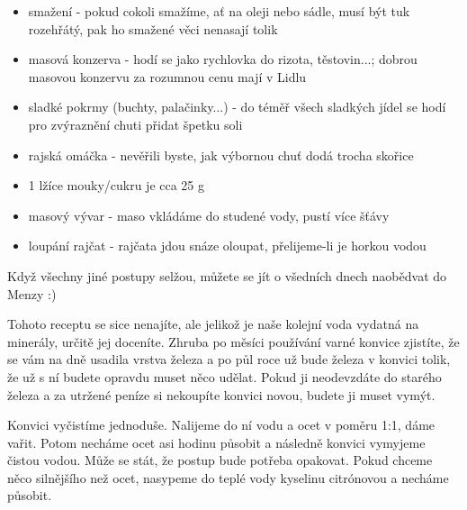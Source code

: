 \begin{itemize}
\item smažení - pokud cokoli smažíme, ať na oleji nebo sádle, musí být tuk
rozehřátý, pak ho smažené věci nenasají tolik
\item masová konzerva - hodí se jako rychlovka do rizota, těstovin...; dobrou
masovou konzervu za rozumnou cenu mají v Lidlu
\item sladké pokrmy (buchty, palačinky...) - do téměř všech sladkých jídel se
hodí pro zvýraznění chuti přidat špetku soli
\item rajská omáčka - nevěřili byste, jak výbornou chuť dodá trocha skořice
\item 1 lžíce mouky/cukru je cca 25 g
\item masový vývar - maso vkládáme do studené vody, pustí více šťávy
\item loupání rajčat - rajčata jdou snáze oloupat, přelijeme-li je horkou vodou
\end{itemize}

Když všechny jiné postupy selžou, můžete se jít o všedních dnech naobědvat do
Menzy :)

Tohoto receptu se sice nenajíte, ale jelikož je naše kolejní voda vydatná na
minerály, určitě jej doceníte. Zhruba po měsíci používání varné konvice
zjistíte, že se vám na dně usadila vrstva železa a po půl roce už bude železa v
konvici tolik, že už s ní budete opravdu muset něco udělat. Pokud ji neodevzdáte
do starého železa a za utržené peníze si nekoupíte konvici novou, budete ji
muset vymýt.

Konvici vyčistíme jednoduše. Nalijeme do ní vodu a ocet v poměru 1:1, dáme
vařit. Potom necháme ocet asi hodinu působit a následně konvici vymyjeme čistou
vodou. Může se stát, že postup bude potřeba opakovat. Pokud chceme něco
silnějšího než ocet, nasypeme do teplé vody kyselinu citrónovou a necháme
působit.